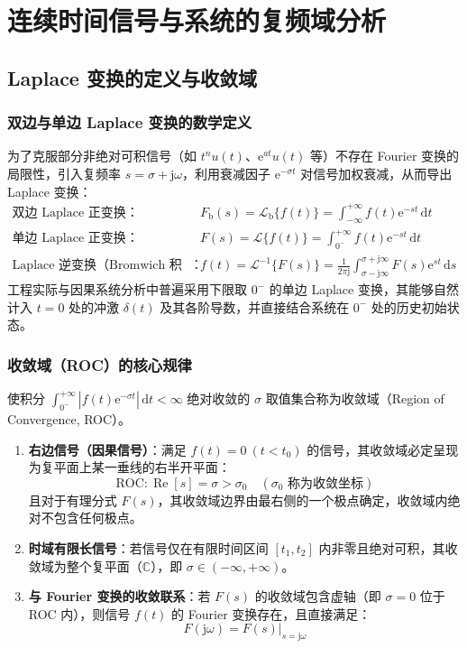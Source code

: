 \documentclass[11pt,a4paper,fontset=fandol]{ctexart}
\theoremstyle{remark}
\begin{document}
\section{连续时间信号与系统的复频域分析}

\subsection{Laplace 变换的定义与收敛域}

\subsubsection{双边与单边 Laplace 变换的数学定义}
为了克服部分非绝对可积信号（如 $t^n u(t)$、$\mathrm{e}^{at} u(t)$ 等）不存在 Fourier 变换的局限性，引入复频率 $s = \sigma + \mathrm{j}\omega$，利用衰减因子 $\mathrm{e}^{-\sigma t}$ 对信号加权衰减，从而导出 Laplace 变换：
\begin{align}
    \text{双边 Laplace 正变换}：& F_{\mathrm{b}}(s) = \mathcal{L}_{\mathrm{b}}\{f(t)\} = \int_{-\infty}^{+\infty} f(t)\mathrm{e}^{-st}\,\mathrm{d}t \\
    \text{单边 Laplace 正变换}：& F(s) = \mathcal{L}\{f(t)\} = \int_{0^-}^{+\infty} f(t)\mathrm{e}^{-st}\,\mathrm{d}t \\
    \text{Laplace 逆变换（Bromwich 积分）}：& f(t) = \mathcal{L}^{-1}\{F(s)\} = \frac{1}{2\pi \mathrm{j}} \int_{\sigma - \mathrm{j}\infty}^{\sigma + \mathrm{j}\infty} F(s)\mathrm{e}^{st}\,\mathrm{d}s
\end{align}
工程实际与因果系统分析中普遍采用下限取 $0^-$ 的单边 Laplace 变换，其能够自然计入 $t = 0$ 处的冲激 $\delta(t)$ 及其各阶导数，并直接结合系统在 $0^-$ 处的历史初始状态。

\subsubsection{收敛域（ROC）的核心规律}
使积分 $\int_{0^-}^{+\infty} |f(t)\mathrm{e}^{-\sigma t}|\,\mathrm{d}t < \infty$ 绝对收敛的 $\sigma$ 取值集合称为收敛域（Region of Convergence, ROC）。
\begin{enumerate}
    \item \textbf{右边信号（因果信号）}：满足 $f(t) = 0 \ (t < t_0)$ 的信号，其收敛域必定呈现为复平面上某一垂线的右半开平面：
    \begin{equation}
        \mathrm{ROC}: \operatorname{Re}[s] = \sigma > \sigma_0 \quad (\sigma_0 \text{ 称为收敛坐标})
    \end{equation}
    且对于有理分式 $F(s)$，其收敛域边界由最右侧的一个极点确定，收敛域内绝对不包含任何极点。
    \item \textbf{时域有限长信号}：若信号仅在有限时间区间 $[t_1, t_2]$ 内非零且绝对可积，其收敛域为整个复平面（$\mathbb{C}$），即 $\sigma \in (-\infty, +\infty)$。
    \item \textbf{与 Fourier 变换的收敛联系}：若 $F(s)$ 的收敛域包含虚轴（即 $\sigma = 0$ 位于 ROC 内），则信号 $f(t)$ 的 Fourier 变换存在，且直接满足：
    \begin{equation}
        F(\mathrm{j}\omega) = \left. F(s) \right|_{s = \mathrm{j}\omega}
    \end{equation}
\end{enumerate}
\end{document}
